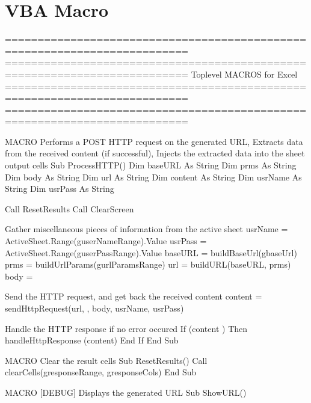 \documentclass[letterpaper,10pt,english]{sphinxmanual}
\begin{document}
\section{VBA Macro}
\label{\detokenize{TN201904:vba-macro}}
\begin{sphinxVerbatim}[commandchars=\\\{\}]
\PYGZsq{}==========================================================================
\PYGZsq{}==========================================================================
\PYGZsq{}
\PYGZsq{}   Top\PYGZhy{}level MACROS for Excel
\PYGZsq{}
\PYGZsq{}==========================================================================
\PYGZsq{}==========================================================================

\PYGZsq{} \PYGZhy{} MACRO \PYGZhy{}
\PYGZsq{} \PYGZgt{} Performs a POST HTTP request on the generated URL,
\PYGZsq{} \PYGZgt{} Extracts data from the received content (if successful),
\PYGZsq{} \PYGZgt{} Injects the extracted data into the sheet \PYGZsq{}output\PYGZsq{} cells
\PYGZsq{}
Sub ProcessHTTP()
      Dim baseURL As String
      Dim prms As String
      Dim body As String
      Dim url As String
      Dim content As String
      Dim usrName As String
      Dim usrPass As String

      Call ResetResults
      Call ClearScreen

      \PYGZsq{} Gather miscellaneous pieces of information from the active sheet
      usrName = ActiveSheet.Range(g\PYGZus{}userNameRange).Value
      usrPass = ActiveSheet.Range(g\PYGZus{}userPassRange).Value
      baseURL = buildBaseUrl(g\PYGZus{}baseUrl)
      prms = buildUrlParams(g\PYGZus{}urlParamsRange)
      url = buildURL(baseURL, prms)
      body = \PYGZdq{}\PYGZdq{}

      \PYGZsq{} Send the HTTP request, and get back the received content
      content = sendHttpRequest(url, , body, usrName, usrPass)

      \PYGZsq{} Handle the HTTP response if no error occured
      If (content \PYGZlt{}\PYGZgt{} \PYGZdq{}\PYGZdq{}) Then
            handleHttpResponse (content)
      End If
End Sub


\PYGZsq{} \PYGZhy{} MACRO \PYGZhy{}
\PYGZsq{} Clear the result cells
\PYGZsq{}
Sub ResetResults()
      Call clearCells(g\PYGZus{}responseRange, g\PYGZus{}responseCols)
End Sub


\PYGZsq{} \PYGZhy{} MACRO \PYGZhy{} [DEBUG] \PYGZhy{}
\PYGZsq{} Displays the generated URL
\PYGZsq{}
Sub ShowURL()


\end{sphinxVerbatim}
\end{document}
